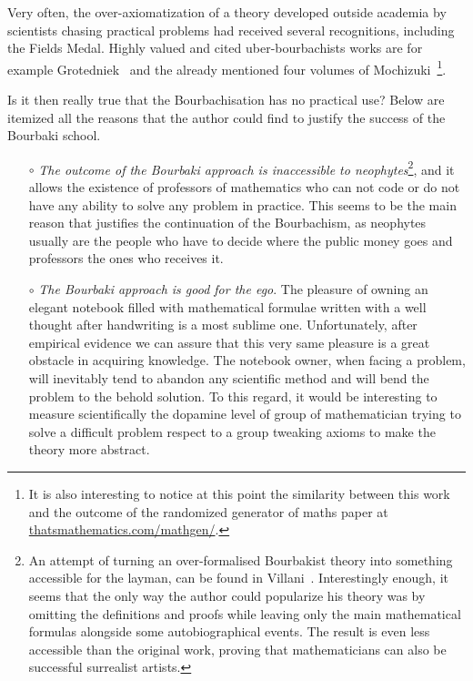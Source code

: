 \documentclass[]{scrartcl}
\theoremstyle{definition}
\begin{document}
Very often, the over-axiomatization of a theory developed outside academia by scientists chasing practical problems had received several recognitions, including the Fields Medal.
Highly valued and cited uber-bourbachists works are for example Grotedniek~\cite{grothendieck2011some} and the already mentioned four volumes of Mochizuki~\cite{mochizuki2012inter}\footnote{
    It is also interesting to notice at this point the similarity between this work and the outcome of the randomized generator of maths paper at \href{https://thatsmathematics.com/mathgen/}{thatsmathematics.com/mathgen/}.
}.


Is it then really true that the Bourbachisation has no practical use? Below are itemized all the reasons that the author could find to justify the success of the Bourbaki school.

\begin{itemize}
    \item[$\circ$] \emph{The outcome of the Bourbaki approach is inaccessible to neophytes}\footnote{
        An attempt of turning an over-formalised Bourbakist theory into something accessible for the layman, can be found in Villani~\cite{villani2003livingtheorem}. Interestingly enough, it seems that the only way the author could popularize his theory was by omitting the definitions and proofs while leaving only the main mathematical formulas alongside some autobiographical events. The result is even less accessible than the original work, proving that mathematicians can also be successful surrealist artists.
    }, and it allows the existence of professors of mathematics who can not code or do not have any ability to solve any problem in practice. This seems to be the main reason that justifies the continuation of the Bourbachism, as neophytes usually are the people who have to decide where the public money goes and professors the ones who receives it.

    \item[$\circ$] \emph{The Bourbaki approach is good for the ego}. The pleasure of owning an elegant notebook filled with mathematical formulae written with a well thought after handwriting is a most sublime one. Unfortunately, after empirical evidence we can assure that this very same pleasure is a great obstacle in acquiring knowledge. The notebook owner, when facing a problem, will inevitably tend to abandon any scientific method and will bend the problem to the behold solution. To this regard, it would be interesting to measure scientifically the dopamine level of group of mathematician trying to solve a difficult problem respect to a group tweaking axioms to make the theory more abstract.


\end{itemize}
\end{document}
